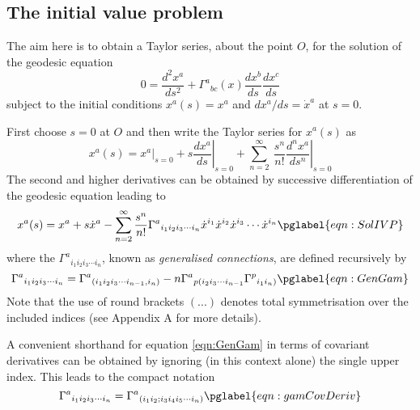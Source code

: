 \documentclass[a4paper,12pt]{article}
\numberwithin{equation}{section}
\begin{document}
\subsection{The initial value problem}\label{sub:CoordsIVP}

The aim here is to obtain a Taylor series, about the point $O$, for the solution of the
geodesic equation
\[
0 = \frac{d^2x^a}{ds^2} + \Gamma^a{}_{bc}(x) \frac{dx^b}{ds}\frac{dx^c}{ds}
\]
subject to the initial conditions $x^a(s) = x^a$ and $dx^a/ds={\Dot x}^a$ at $s=0$.

First choose $s=0$ at $O$ and then write the Taylor series for $x^a(s)$ as
\[
x^a(s) = \left.x^a\right\vert_{s=0}
       + s \left.\frac{dx^a}{ds}\right\vert_{s=0}
       + \sum_{n=2}^\infty\> \frac{s^n}{n!}\left.\frac{d^nx^a}{ds^n}\right\vert_{s=0}
\]
The second and higher derivatives can be obtained by successive differentiation of the
geodesic equation leading to
\begin{equation}
x^a(s) = x^a + s {\Dot x}^a
       - \sum_{n=2}^\infty \frac{s^n}{n!}\Gamma^{a}{}_{i_1i_2i_3\cdots i_n}
                                         {\Dot x}^{i_1}
                                         {\Dot x}^{i_2}
                                         {\Dot x}^{i_3}\cdots
                                         {\Dot x}^{i_n}
\pglabel{eqn:SolIVP}
\end{equation}
where the $\Gamma^{a}{}_{i_1i_2i_3\cdots i_n}$, known as \emph{generalised connections},
are defined recursively by
\begin{equation}
\Gamma^{a}{}_{i_1i_2i_3\cdots i_n} = \Gamma^{a}{}_{(i_1i_2i_3\cdots i_{n-1},i_n)}
                                 - n \Gamma^{a}{}_{p(i_2i_3\cdots i_{n-1}}
                                     \Gamma^{p}{}_{i_1i_n)}
\pglabel{eqn:GenGam}
\end{equation}
Note that the use of round brackets $(...)$ denotes total symmetrisation over the included
indices (see Appendix A for more details).

A convenient shorthand for equation \eqref{eqn:GenGam} in terms of covariant derivatives can
be obtained by ignoring (in this context alone) the single upper index. This leads to the
compact notation
\begin{equation}
\Gamma^{a}{}_{i_1i_2i_3\cdots i_n} = \Gamma^{a}{}_{(i_1i_2;i_3i_4i_5\cdots i_n)}
\pglabel{eqn:gamCovDeriv}
\end{equation}

\end{document}
